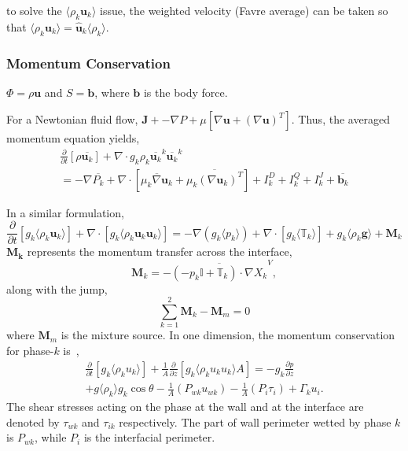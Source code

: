\documentclass[11pt]{article}
\begin{document}
to solve the $\langle \rho_k \mathbf{u}_{k} \rangle$ issue, the weighted velocity (Favre average) can be taken so that $\langle \rho_{k} \mathbf{u}_{k} \rangle = \mathbf{\hat{u}}_{k} \langle \rho_{k} \rangle$.
\subsubsection{Momentum Conservation}
$\Phi=\rho \mathbf{u}$ and $S = \mathbf{b}$, where $\mathbf{b}$ is the body force.

For a Newtonian fluid flow, $\mathbf{J} + -\nabla P + \mu[\nabla \mathbf{u} + {(\nabla \mathbf{u})}^{T}]$. Thus, the averaged momentum equation yields,
\begin{multline}
	\frac{\partial}{\partial t}[\rho \overline{\mathbf{u}_{k}}] + \nabla \cdot g_{k} \rho_{k} \overline{\mathbf{u}_k}^{k}\overline{\mathbf{u}_k}^{k}\\
	= -\nabla \overline{P_{k}} + \nabla \cdot {[\overline{\mu_{k} \nabla \mathbf{u}_{k}} + {\overline{\mu_{k} {(\nabla \mathbf{u}_{k})}^{T}}}]} + I^{D}_{k} + I^{Q}_{k} + I^{J}_{k} + \overline{\mathbf{b}_{k}}
\end{multline}

In a similar formulation,
\begin{equation}\label{gov_mom}
	\frac{\partial}{\partial t}[g_{k} \langle \rho_{k} \mathbf{u}_{k} \rangle] + \nabla \cdot [g_{k} \langle \rho_{k} \mathbf{u}_{k} \mathbf{u}_{k} \rangle] = 
	-\nabla(g_{k} \langle p_{k} \rangle) + \nabla \cdot [g_{k} \langle \mathbb{T}_{k} \rangle ] + g_{k}\langle\rho_{k} \mathbf{g} \rangle + \mathbf{M}_k
\end{equation}
$\mathbf{M_{k}}$ represents the momentum transfer across the interface,\
\begin{equation}
	\mathbf{M}_{k} = -\overline{(-p_{k}\mathbf{\mathbb{I}} + \mathbf{\mathbb{T}}_{k}) \cdot \nabla X_{k}}^{V},
\end{equation}
along with the jump,
\begin{equation}
	\sum_{k=1}^{2}\mathbf{M}_k - \mathbf{M}_m = 0
\end{equation}
where $\mathbf{M}_{m}$ is the mixture source.
In one dimension, the momentum conservation for phase-$k$ is~\cite{hewittModellingStrategiesTwoPhase2018},
\begin{multline}
\frac{\partial}{\partial t}[g_{k}\langle \rho_{k} u_{k}\rangle] + \frac{1}{A} \frac{\partial}{\partial z}[g_{k} \langle \rho_{k} u_{k} u_k\rangle A]
= - g_{k} \frac{\partial p}{\partial z}\\ + g\langle\rho_{k}\rangle g_{k} \cos \theta - \frac{1}{A} (P_{wk}u_{wk}) - \frac{1}{A} (P_i \tau_i) + \Gamma_k u_i.
\end{multline}
The shear stresses acting on the phase at the wall and at the interface are denoted by $\tau_{wk}$ and $\tau_{ik}$ respectively. The part of wall perimeter wetted by phase $k$ is $P_{wk}$, while $P_i$ is the interfacial perimeter.
\end{document}

